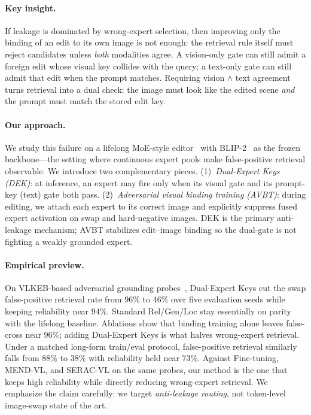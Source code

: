 \documentclass[letterpaper]{article} %
\begin{document}
\paragraph{Key insight.}
If leakage is dominated by wrong-expert selection, then improving only the binding of an edit to its own image is not enough: the retrieval rule itself must reject candidates unless \emph{both} modalities agree.
A vision-only gate can still admit a foreign edit whose visual key collides with the query; a text-only gate can still admit that edit when the prompt matches.
Requiring vision $\wedge$ text agreement turns retrieval into a dual check: the image must look like the edited scene \emph{and} the prompt must match the stored edit key.

\paragraph{Our approach.}
We study this failure on a lifelong MoE-style editor~\citep{chen2025liveedit} with BLIP-2~\citep{li2023blip2} as the frozen backbone---the setting where continuous expert pools make false-positive retrieval observable.
We introduce two complementary pieces.
(1)~\emph{Dual-Expert Keys (DEK)}: at inference, an expert may fire only when its visual gate and its prompt-key (text) gate both pass.
(2)~\emph{Adversarial visual binding training (AVBT)}: during editing, we attach each expert to its correct image and explicitly suppress fused expert activation on swap and hard-negative images.
DEK is the primary anti-leakage mechanism; AVBT stabilizes edit--image binding so the dual-gate is not fighting a weakly grounded expert.

\paragraph{Empirical preview.}
On VLKEB-based adversarial grounding probes~\citep{huang2024vlkeb}, Dual-Expert Keys cut the swap false-positive retrieval rate from $96\%$ to $46\%$ over five evaluation seeds while keeping reliability near $94\%$.
Standard Rel/Gen/Loc stay essentially on parity with the lifelong baseline.
Ablations show that binding training alone leaves false-cross near $96\%$; adding Dual-Expert Keys is what halves wrong-expert retrieval.
Under a matched long-form train/eval protocol, false-positive retrieval similarly falls from $88\%$ to $38\%$ with reliability held near $73\%$.
Against Fine-tuning, MEND-VL, and SERAC-VL on the same probes, our method is the one that keeps high reliability while directly reducing wrong-expert retrieval.
We emphasize the claim carefully: we target \emph{anti-leakage routing}, not token-level image-swap state of the art.
\end{document}
